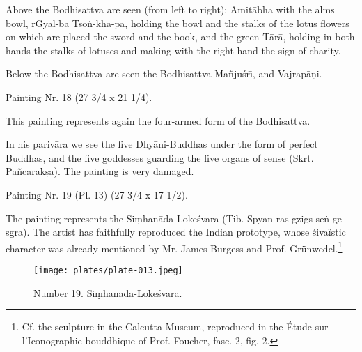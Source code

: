 \documentclass[a4paper, 12pt, oneside]{article}
\begin{document}
Above the Bodhisattva are seen (from left to right): Amit\={a}bha with the alms bowl, rGyal-ba Tso\.{n}-kha-pa, holding the bowl and the stalks of the lotus flowers on which are placed the sword and the book, and the green T\={a}r\={a}, holding in both hands the stalks of lotuses and making with the right hand the sign of charity.

Below the Bodhisattva are seen the Bodhisattva Ma\~{n}ju\'{s}r\={\i}, and Vajrap\={a}\d{n}i.

\bigskip

Painting Nr. 18 (27 3/4 x 21 1/4).

\bigskip

This painting represents again the four-armed form of the Bodhisattva.

In his pariv\={a}ra we see the five Dhy\={a}ni-Buddhas under the form of perfect Buddhas, and the five goddesses guarding the five organs of sense (Skrt. Pa\~{n}carak\d{s}\={a}). The painting is very damaged.

\bigskip

Painting Nr. 19 (Pl. 13) (27 3/4 x 17 1/2).
 
\bigskip

The painting represents the Si\d{m}han\={a}da Loke\'{s}vara (Tib. Spyan-ras-gzigs se\.{n}-ge-sgra). The artist has faithfully reproduced the Indian prototype, whose \'{s}ivaïstic character was already mentioned by Mr. James Burgess and Prof. Grünwedel.\footnote{Cf. the sculpture in the Calcutta Museum, reproduced in the Étude sur l'Iconographie bouddhique of Prof. Foucher, fasc. 2, fig. 2.}

\clearpage
\begin{figure}[H]
\centering
\texttt{[image: plates/plate-013.jpeg]}
\caption*{Number 19. Si\d{m}han\={a}da-Loke\'{s}vara.}
\end{figure}
\clearpage
\end{document}
